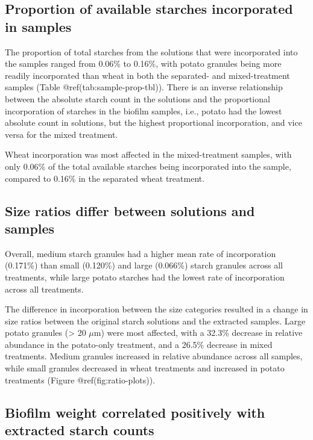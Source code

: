 \documentclass[
  letterpaper,
]{book}
\begin{document}
\hypertarget{proportion-of-available-starches-incorporated-in-samples}{%
\subsection{Proportion of available starches incorporated in
samples}\label{proportion-of-available-starches-incorporated-in-samples}}

The proportion of total starches from the solutions that were
incorporated into the samples ranged from 0.06\% to 0.16\%, with potato
granules being more readily incorporated than wheat in both the
separated- and mixed-treatment samples (Table
@ref(tab:sample-prop-tbl)). There is an inverse relationship between the
absolute starch count in the solutions and the proportional
incorporation of starches in the biofilm samples, i.e., potato had the
lowest absolute count in solutions, but the highest proportional
incorporation, and vice versa for the mixed treatment.

Wheat incorporation was most affected in the mixed-treatment samples,
with only 0.06\% of the total available starches being incorporated into
the sample, compared to 0.16\% in the separated wheat treatment.

\hypertarget{size-ratios-differ-between-solutions-and-samples}{%
\subsection{Size ratios differ between solutions and
samples}\label{size-ratios-differ-between-solutions-and-samples}}

Overall, medium starch granules had a higher mean rate of incorporation
(0.171\%) than small (0.120\%) and large (0.066\%) starch granules
across all treatments, while large potato starches had the lowest rate
of incorporation across all treatments.

The difference in incorporation between the size categories resulted in
a change in size ratios between the original starch solutions and the
extracted samples. Large potato granules (\textgreater{} 20 \(\mu\)m)
were most affected, with a 32.3\% decrease in relative abundance in the
potato-only treatment, and a 26.5\% decrease in mixed treatments. Medium
granules increased in relative abundance across all samples, while small
granules decreased in wheat treatments and increased in potato
treatments (Figure @ref(fig:ratio-plots)).

\hypertarget{biofilm-weight-correlated-positively-with-extracted-starch-counts}{%
\subsection{Biofilm weight correlated positively with extracted starch
counts}\label{biofilm-weight-correlated-positively-with-extracted-starch-counts}}
\end{document}
